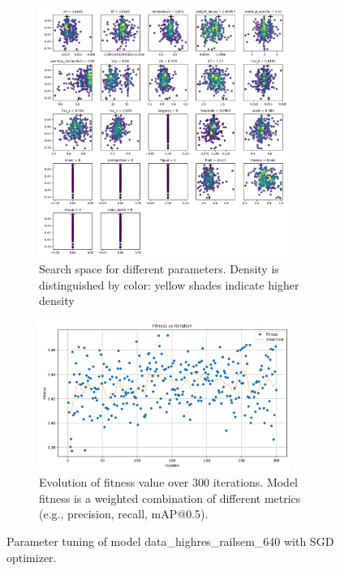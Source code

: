 \documentclass[Master,MDS,english]{BASE/twbook} %
\begin{document}
\begin{figure}
\centering
\begin{subfigure}{.5\textwidth}
  \centering
  \includegraphics[width=0.9\textwidth]{images/yolo/highres/sgd/tune_scatter_plots}
  \caption{Search space for different parameters. Density is distinguished by color: yellow shades indicate higher density}
\end{subfigure}%
\begin{subfigure}{.5\textwidth}
  \centering
  \includegraphics[width=0.9\textwidth]{images/yolo/highres/sgd/tune_fitness}
  \caption{Evolution of fitness value over 300 iterations. Model fitness is a weighted combination of different metrics (e.g., precision, recall, mAP@0.5).}
  \label{fig:images_from_videos}
\end{subfigure}
\caption{Parameter tuning of model data\_highres\_railsem\_640 with SGD optimizer. \\ }
\label{fig:yolo_tune_highres_sgd}
\end{figure}
\end{document}
